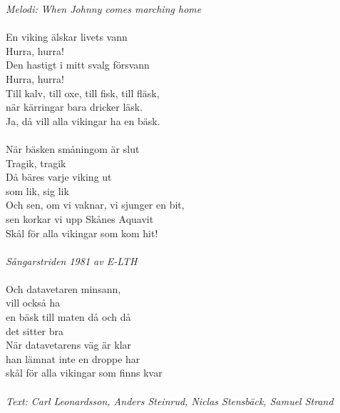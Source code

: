 {\footnotesize\textit{Melodi: When Johnny comes marching home}}\\
\\
En viking älskar livets vann\\
Hurra, hurra!\\
Den hastigt i mitt svalg försvann\\
Hurra, hurra!\\
Till kalv, till oxe, till fisk, till fläsk,\\
när kärringar bara dricker läsk.\\
Ja, då vill alla vikingar ha en bäsk.\\
\\
När bäsken småningom är slut\\
Tragik, tragik\\
Då bäres varje viking ut\\
som lik, sig lik\\
Och sen, om vi vaknar, vi sjunger en bit,\\
sen korkar vi upp Skånes Aquavit\\
Skål för alla vikingar som kom hit!\\
\\
{\footnotesize\textit{Sångarstriden 1981 av E-LTH}}\\
\\
Och datavetaren minsann,\\
vill också ha\\
en bäsk till maten då och då\\
det sitter bra\\
När datavetarens väg är klar\\
han lämnat inte en droppe har\\
skål för alla vikingar som finns kvar\\
\\
{\footnotesize\textit{Text: Carl Leonardsson, Anders Steinrud, Niclas Stensbäck, Samuel Strand}}

